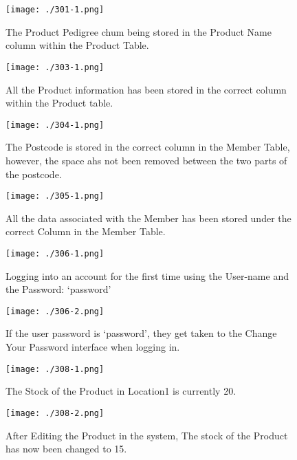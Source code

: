 \begin{figure}[H]
    \texttt{[image: ./301-1.png]}
    \caption{The Product Pedigree chum being stored in the Product Name column within the Product Table.} \label{fig:301-1}
\end{figure}

\begin{figure}[H]
    \texttt{[image: ./303-1.png]}
    \caption{All the Product information has been stored in the correct column within the Product table.} \label{fig:303-1}
\end{figure}

\begin{figure}[H]
    \texttt{[image: ./304-1.png]}
    \caption{The Postcode is stored in the correct column in the Member Table, however, the space ahs not been removed between the two parts of the postcode.} \label{fig:304-1}
\end{figure}

\begin{figure}[H]
    \texttt{[image: ./305-1.png]}
    \caption{All the data associated with the Member has been stored under the correct Column in the Member Table.} \label{fig:305-1}
\end{figure}

\begin{figure}[H]
    \texttt{[image: ./306-1.png]}
    \caption{Logging into an account for the first time using the User-name and the Password: `password' } \label{fig:306-1}
\end{figure}

\begin{figure}[H]
    \texttt{[image: ./306-2.png]}
    \caption{If the user password is `password', they get taken to the Change Your Password interface when logging in. } \label{fig:306-2}
\end{figure}

\begin{figure}[H]
    \texttt{[image: ./308-1.png]}
    \caption{The Stock of the Product in Location1 is currently 20.} \label{fig:308-1}
\end{figure}

\begin{figure}[H]
    \texttt{[image: ./308-2.png]}
    \caption{After Editing the Product in the system, The stock of the Product has now been changed to 15.} \label{fig:308-2}
\end{figure}

